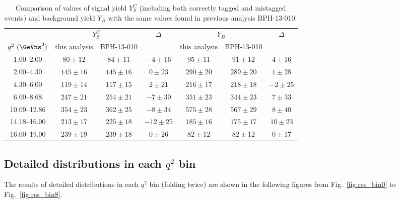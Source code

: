 \begin{table*}[!htb]
  \begin{center}
    \caption{Comparison of values of signal yield $Y^{C}_{S}$ (including both correctly tagged and mistagged events) and background yield $Y_{B}$ with the same values found in previous analysis BPH-13-010.\label{tab:yieldComp}}

    \begin{tabular}{c|ccc|ccc}
      \hline
      & \multicolumn{2}{c}{$Y^{C}_{S}$} & $\Delta$  & \multicolumn{2}{c}{$Y_{B}$} & $\Delta$ \\
      $q^2~(\GeVns^2)$      & this analysis & BPH-13-010 & & this analysis & BPH-13-010 &\\
      \hline         
      1.00--2.00     & $80  \pm 12$ & $ 84 \pm 11$ & $-4\pm16$  &   $ 95\pm 11$    & $ 91 \pm 12$ & $4  \pm 16$\\
      2.00--4.30     & $145 \pm 16$ & $145 \pm 16$ & $0\pm23$   &   $290\pm 20$    & $289 \pm 20$ & $1  \pm 28$\\
      4.30--6.00     & $119 \pm 14$ & $117 \pm 15$ & $2\pm21$   &   $216\pm 17$    & $218 \pm 18$ & $-2 \pm 25$\\
      6.00--8.68     & $247 \pm 21$ & $254 \pm 21$ & $-7\pm30$  &   $351\pm 23$    & $344 \pm 23$ & $7  \pm 33$\\
      10.09--12.86   & $354 \pm 23$ & $362 \pm 25$ & $-8\pm34$  &   $575\pm 28$    & $567 \pm 29$ & $8  \pm 40$\\
      14.18--16.00   & $213 \pm 17$ & $225 \pm 18$ & $-12\pm25$ &   $185\pm 16$    & $175 \pm 17$ & $10 \pm 23$\\
      16.00--19.00   & $239 \pm 19$ & $239 \pm 18$ & $0\pm26$   &   $ 82\pm 12$    & $ 82 \pm 12$ & $0  \pm 17$\\

      \hline
    \end{tabular}
  \end{center}
\end{table*}



\clearpage

\subsection{Detailed distributions in each $q^2$ bin}
\label{sec:res-proj}

The results of detailed distributions in each $q^2$ bin (folding twice) are shown in the following figures from Fig.~\ref{fig:res_bin0} to Fig.~\ref{fig:res_bin8}.

